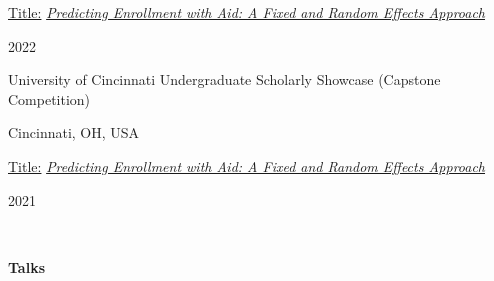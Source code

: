 \begin{minipage}{.75\linewidth} \begin{flushleft}
    \hspace{1cm} \underline{Title:} \href{https://github.com/posmikdc/posmikdc.github.io/blob/master/pdf/PosmikDaniel_ESPPresentation.pdf}{\textit{Predicting Enrollment with Aid: A Fixed and Random Effects Approach}}
    \end{flushleft} \end{minipage}
\hfill 
\begin{minipage}{.20\linewidth}\begin{flushright}
     2022
    \end{flushright}\end{minipage}

\vspace{2pt}
\begin{minipage}{.75\linewidth} \begin{flushleft}
      \begin{description}[font=$\bullet$]
      \item{University of Cincinnati Undergraduate Scholarly Showcase (Capstone Competition)}
      \end{description}
    \end{flushleft} \end{minipage}
\hfill 
\begin{minipage}{.20\linewidth}\begin{flushright}
     Cincinnati, OH, USA
    \end{flushright}\end{minipage}
 
\begin{minipage}{.75\linewidth} \begin{flushleft}
    \hspace{1cm} \underline{Title:} \href{https://journals.uc.edu/index.php/Undergradshowcase/article/view/4431}{\textit{Predicting Enrollment with Aid: A Fixed and Random Effects Approach}}
    \end{flushleft} \end{minipage}
\hfill 
\begin{minipage}{.20\linewidth}\begin{flushright}
     2021
    \end{flushright}\end{minipage}

\\
\vspace{5pt}
\begin{minipage}{.75\linewidth}
  \textbf{Talks}
\end{minipage} \\

